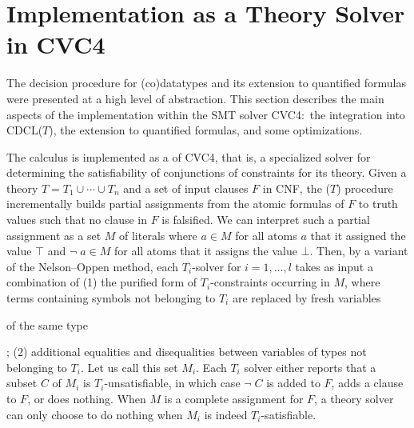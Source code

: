 \section{Implementation as a Theory Solver in CVC4}
\label{sec:implementation-as-a-theory-solver-in-cvc4}

The decision procedure for (co)datatypes and its extension to quantified
formulas were presented at a high level of abstraction. This section describes
the main aspects of the implementation within the SMT solver CVC4:\ the
integration into CDCL($T$), the extension to quantified formulas, and
some optimizations.


The calculus is implemented as a  of CVC4, that is, a
specialized solver for determining the satisfiability of conjunctions of
constraints for its theory.
Given a theory $T = T_1 \mathrel\cup \cdots \mathrel\cup T_n$ and a set of
input clauses $F$ in CNF, the \XXXL($T$) procedure
incrementally builds partial assignments from the atomic formulas of $F$ to
truth values such that no clause in $F$ is falsified. We can interpret such a
partial assignment as a set $M$ of literals where $a \in M$ for all atoms $a$ that
it assigned the value $\top$ and $\neg\; a \in M$ for all atoms that it assigns
the value $\bot$. Then, %
by a variant
\cite{jovanovic2011sharing} of the Nelson--Oppen method,
each $T_i$-solver for $i = 1, \ldots, l$ takes as input a combination
of (1) the purified form of $T_i$-constraints occurring in $M$, where terms
containing symbols not belonging to $T_i$ are replaced by fresh variables \begin{rep}of the
same type\end{rep}; (2) additional equalities and disequalities between variables of
types not belonging to $T_i$. Let us call this set $M_i$. Each $T_i$ solver
either reports that a subset $C$ of $M_i$ is $T_i$-unsatisfiable, in which case
$\neg\; C$ is added to $F\!$, adds a clause to $F\!$, or does nothing.
When $M$ is a complete assignment for $F\!$, a theory solver can only choose to do
nothing when $M_i$ is indeed $T_i$-satisfiable.

